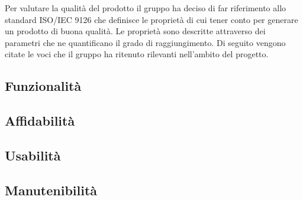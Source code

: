 Per valutare la qualità del prodotto il gruppo ha deciso di far riferimento allo standard ISO/IEC 9126\glo{}
che definisce le proprietà di cui tener conto per generare un prodotto di buona qualità. 
Le proprietà sono descritte attraverso dei parametri che ne quantificano il grado di raggiungimento. 
Di seguito vengono citate le voci che il gruppo ha ritenuto rilevanti nell’ambito del progetto.

\subsection{Funzionalità}


\subsection{Affidabilità}


\subsection{Usabilità}


\subsection{Manutenibilità}
